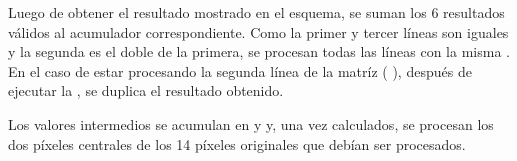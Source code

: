 Luego de obtener el resultado mostrado en el esquema, se suman los 6 resultados válidos al acumulador correspondiente. 
Como la primer y tercer líneas son iguales y la segunda es el doble de la primera, se procesan todas las líneas con la misma . 
En el caso de estar procesando la segunda línea de la matríz (
), después de ejecutar la  , se duplica el resultado obtenido.

	Los valores intermedios se acumulan en  y  y, una vez calculados, se procesan los dos píxeles centrales de los 14 píxeles 
originales que debían ser procesados.

